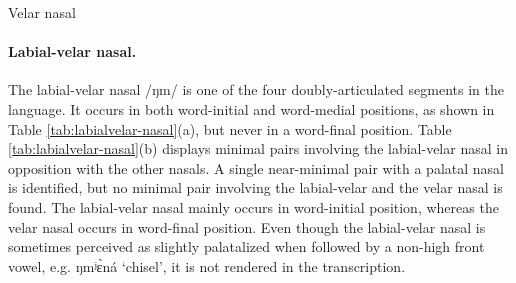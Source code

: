 \begin{table}[!htb] \small
\centering
\caption{Velar nasal\label{tab:velar-nasal}}

\quad
{}

\end{table}


\clearpage

\paragraph{Labial-velar nasal.}


The labial-velar nasal /{\sls ŋm}/ is one of the four doubly-articulated 
segments in 
the language. It occurs in both word-initial and word-medial positions, as shown 
in Table \ref{tab:labialvelar-nasal}(a),  but  never in a word-final position. 
Table \ref{tab:labialvelar-nasal}(b) displays  minimal pairs involving the 
labial-velar nasal  in opposition with the other nasals. A single near-minimal 
pair with a palatal nasal is identified, but no minimal pair involving the 
labial-velar and the velar  nasal is found. The labial-velar nasal   mainly 
occurs in word-initial position, whereas the velar nasal occurs  in word-final 
position.  Even though the labial-velar nasal is sometimes perceived as slightly 
palatalized when followed by a non-high front vowel, e.g. {\sls ŋmʲɛ̀ná} 
`chisel', it is not rendered in the transcription.



